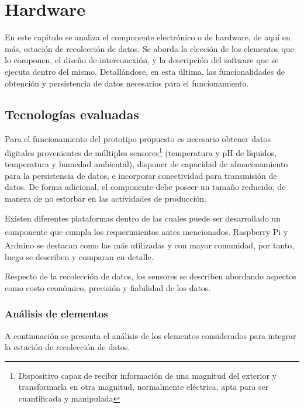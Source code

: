 \chapter{Hardware}

\par En este capítulo se analiza el componente electrónico o de hardware, de aquí en más, estación de recolección de datos. Se aborda la elección de los elementos que lo componen, el diseño de interconexión, y la descripción del software que se ejecuta dentro del mismo. Detallándose, en esta última, las funcionalidades de obtención y persistencia de datos necesarios para el funcionamiento.

\section{Tecnologías evaluadas}
\label{SeccionTecnoEvalHardware}
    \par Para el funcionamiento del prototipo propuesto es necesario obtener datos digitales provenientes de múltiples sensores\footnote{Dispositivo capaz de recibir información de una magnitud del exterior y transformarla en otra magnitud, normalmente eléctrica, apta para ser cuantificada y manipulada} (temperatura y pH de líquidos,  temperatura y humedad ambiental), disponer de capacidad de almacenamiento para la persistencia de datos, e incorporar conectividad para transmisión de datos. De forma adicional, el componente debe poseer un tamaño reducido, de manera de no estorbar en las actividades de producción.

    \par Existen diferentes plataformas dentro de las cuales puede ser desarrollado un componente que cumpla los requerimientos antes mencionados. Raspberry Pi\textsuperscript{\textregistered} y Arduino\textsuperscript{\textregistered} se destacan como las más utilizadas y con mayor comunidad, por tanto, luego se describen y comparan en detalle.
    
    \par Respecto de la recolección de datos, los sensores se describen abordando aspectos como costo económico, precisión y fiabilidad de los datos.
    
    \subsection{Análisis de elementos}
    \par A continuación se presenta el análisis de los elementos considerados para integrar la estación de recolección de datos.
    
